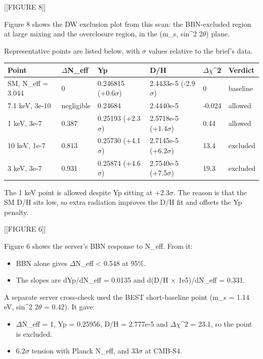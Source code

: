 \documentclass[11pt,a4paper]{article}
\begin{document}
[[FIGURE 8]]

Figure 8 shows the DW exclusion plot from this scan: the BBN-excluded region at large mixing and the overclosure region, in the (m\_s, sin\textasciicircum{}2 2$\theta$) plane.

Representative points are listed below, with $\sigma$ values relative to the brief's data.

\begin{longtable}{@{}p{}p{}p{}p{}p{}p{}@{}}
\toprule
\textbf{Point} & \textbf{$\Delta$N\_eff} & \textbf{Yp} & \textbf{D/H} & \textbf{$\Delta$$\chi$\textasciicircum{}2} & \textbf{Verdict} \\ \midrule \endhead
SM, N\_eff = 3.044 & 0 & 0.246815 (+0.6$\sigma$) & 2.4433e-5 (-2.9$\sigma$) & 0 & baseline \\
7.1 keV, 3e-10 & negligible & 0.24684 & 2.4440e-5 & -0.024 & allowed \\
1 keV, 3e-7 & 0.387 & 0.25193 (+2.3$\sigma$) & 2.5718e-5 (+1.4$\sigma$) & 0.44 & allowed \\
10 keV, 1e-7 & 0.813 & 0.25730 (+4.1$\sigma$) & 2.7145e-5 (+6.2$\sigma$) & 13.4 & excluded \\
3 keV, 3e-7 & 0.931 & 0.25874 (+4.6$\sigma$) & 2.7540e-5 (+7.5$\sigma$) & 19.3 & excluded \\
\bottomrule\end{longtable}
The 1 keV point is allowed despite Yp sitting at +2.3$\sigma$. The reason is that the SM D/H sits low, so extra radiation improves the D/H fit and offsets the Yp penalty.

[[FIGURE 6]]

Figure 6 shows the server's BBN response to N\_eff. From it:

\begin{itemize}
  \item BBN alone gives $\Delta$N\_eff \textless{} 0.548 at 95\%.
  \item The slopes are dYp/dN\_eff = 0.0135 and d(D/H $\times$ 1e5)/dN\_eff = 0.331.
\end{itemize}
A separate server cross-check used the BEST short-baseline point (m\_s = 1.14 eV, sin\textasciicircum{}2 2$\theta$ = 0.42). It gave:

\begin{itemize}
  \item $\Delta$N\_eff = 1, Yp = 0.25956, D/H = 2.777e-5 and $\Delta$$\chi$\textasciicircum{}2 = 23.1, so the point is excluded.
  \item 6.2$\sigma$ tension with Planck N\_eff, and 33$\sigma$ at CMB-S4.
\end{itemize}
\end{document}
